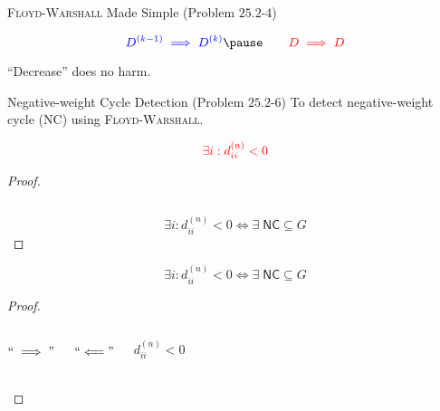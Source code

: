 \begin{frame}{}
  \begin{exampleblock}{\textsc{Floyd-Warshall} Made Simple (Problem $25.2$-$4$)}
    
  \end{exampleblock}

  \pause
  \[
    \blue{D^{(k-1)} \implies D^{(k)}} \pause \qquad \red{D \implies D}
  \]

  \pause
  \centerline{``Decrease'' does no harm.}
\end{frame}

\begin{frame}{}
  \begin{exampleblock}{Negative-weight Cycle Detection (Problem $25.2$-$6$)}
    To detect negative-weight cycle (\textsf{NC}) using \textsc{Floyd-Warshall}.
  \end{exampleblock}

  \pause
  \[
    \textcolor{red}{\exists i: d_{ii}^{(n)} < 0}
  \]

  \begin{proof}
    \begin{columns}
	\pause
	\pause
    \end{columns}

    \pause
    \vspace{0.50cm}
    \[
      \exists i: d_{ii}^{(n)} < 0 \iff \exists\; \textsf{NC} \subseteq G
    \]
  \end{proof}
\end{frame}

\begin{frame}{}
  \[
    \exists i: d_{ii}^{(n)} < 0 \iff \exists\; \textsf{NC} \subseteq G
  \]

  \begin{proof}
    \begin{columns}
        \pause
	\[
	  ``\implies"
	\]

	\pause
	\vspace{-0.60cm}
	{\vspace{-0.30cm}\centerline{}}
	\[
	  ``\Longleftarrow"
	\]

	\pause
	{\vspace{-0.30cm}\centerline{}}

	\pause
	\[
	  d_{ii}^{(n)} < 0
	\]
    \end{columns}
  \end{proof}
\end{frame}

\begin{frame}{}
\end{frame}
